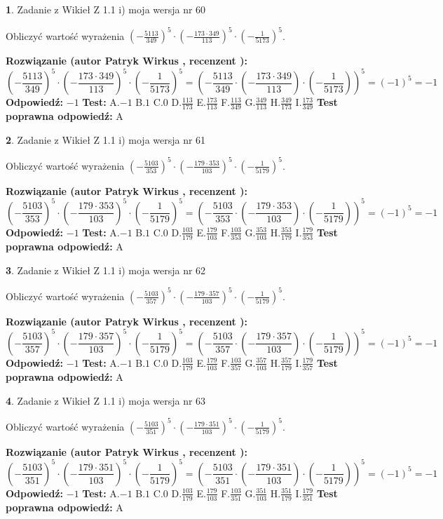 \documentclass[12pt, a4paper]{article}
\theoremstyle{definition} %
\newtheorem{zad}{}
\newcommand{\zadStart}[1]{\begin{zad}#1\newline}
\newcommand{\zadStop}{\end{zad}}
\newcommand{\rozwStart}[2]{\noindent \textbf{Rozwiązanie (autor #1 , recenzent #2): }\newline}
\newcommand{\rozwStop}{\newline}
\newcommand{\odpStart}{\noindent \textbf{Odpowiedź:}\newline}
\newcommand{\odpStop}{\newline}
\newcommand{\testStart}{\noindent \textbf{Test:}\newline}
\newcommand{\testStop}{\newline}
\newcommand{\kluczStart}{\noindent \textbf{Test poprawna odpowiedź:}\newline}
\newcommand{\kluczStop}{\newline}
\begin{document}
\zadStart{Zadanie z Wikieł Z 1.1 i) moja wersja nr 60}

Obliczyć wartość wyrażenia $(-\frac{5113}{349})^{5} \cdot (-\frac{173 \cdot 349}{113})^{5} \cdot (-\frac{1}{5173})^{5}$.
\zadStop
\rozwStart{Patryk Wirkus}{}
$$(-\frac{5113}{349})^{5} \cdot (-\frac{173 \cdot 349}{113})^{5} \cdot (-\frac{1}{5173})^{5} = (-\frac{5113}{349} \cdot (-\frac{173 \cdot 349}{113}) \cdot (-\frac{1}{5173}))^{5} = (-1)^{5} = -1$$
\rozwStop
\odpStart
$-1$
\odpStop
\testStart
A.$-1$ B.$1$ C.$0$ D.$\frac{113}{173}$ E.$\frac{173}{113}$
F.$\frac{113}{349}$ G.$\frac{349}{113}$
H.$\frac{349}{173}$
I.$\frac{173}{349}$
\testStop
\kluczStart
A
\kluczStop



\zadStart{Zadanie z Wikieł Z 1.1 i) moja wersja nr 61}

Obliczyć wartość wyrażenia $(-\frac{5103}{353})^{5} \cdot (-\frac{179 \cdot 353}{103})^{5} \cdot (-\frac{1}{5179})^{5}$.
\zadStop
\rozwStart{Patryk Wirkus}{}
$$(-\frac{5103}{353})^{5} \cdot (-\frac{179 \cdot 353}{103})^{5} \cdot (-\frac{1}{5179})^{5} = (-\frac{5103}{353} \cdot (-\frac{179 \cdot 353}{103}) \cdot (-\frac{1}{5179}))^{5} = (-1)^{5} = -1$$
\rozwStop
\odpStart
$-1$
\odpStop
\testStart
A.$-1$ B.$1$ C.$0$ D.$\frac{103}{179}$ E.$\frac{179}{103}$
F.$\frac{103}{353}$ G.$\frac{353}{103}$
H.$\frac{353}{179}$
I.$\frac{179}{353}$
\testStop
\kluczStart
A
\kluczStop



\zadStart{Zadanie z Wikieł Z 1.1 i) moja wersja nr 62}

Obliczyć wartość wyrażenia $(-\frac{5103}{357})^{5} \cdot (-\frac{179 \cdot 357}{103})^{5} \cdot (-\frac{1}{5179})^{5}$.
\zadStop
\rozwStart{Patryk Wirkus}{}
$$(-\frac{5103}{357})^{5} \cdot (-\frac{179 \cdot 357}{103})^{5} \cdot (-\frac{1}{5179})^{5} = (-\frac{5103}{357} \cdot (-\frac{179 \cdot 357}{103}) \cdot (-\frac{1}{5179}))^{5} = (-1)^{5} = -1$$
\rozwStop
\odpStart
$-1$
\odpStop
\testStart
A.$-1$ B.$1$ C.$0$ D.$\frac{103}{179}$ E.$\frac{179}{103}$
F.$\frac{103}{357}$ G.$\frac{357}{103}$
H.$\frac{357}{179}$
I.$\frac{179}{357}$
\testStop
\kluczStart
A
\kluczStop



\zadStart{Zadanie z Wikieł Z 1.1 i) moja wersja nr 63}

Obliczyć wartość wyrażenia $(-\frac{5103}{351})^{5} \cdot (-\frac{179 \cdot 351}{103})^{5} \cdot (-\frac{1}{5179})^{5}$.
\zadStop
\rozwStart{Patryk Wirkus}{}
$$(-\frac{5103}{351})^{5} \cdot (-\frac{179 \cdot 351}{103})^{5} \cdot (-\frac{1}{5179})^{5} = (-\frac{5103}{351} \cdot (-\frac{179 \cdot 351}{103}) \cdot (-\frac{1}{5179}))^{5} = (-1)^{5} = -1$$
\rozwStop
\odpStart
$-1$
\odpStop
\testStart
A.$-1$ B.$1$ C.$0$ D.$\frac{103}{179}$ E.$\frac{179}{103}$
F.$\frac{103}{351}$ G.$\frac{351}{103}$
H.$\frac{351}{179}$
I.$\frac{179}{351}$
\testStop
\kluczStart
A
\kluczStop
\end{document}
